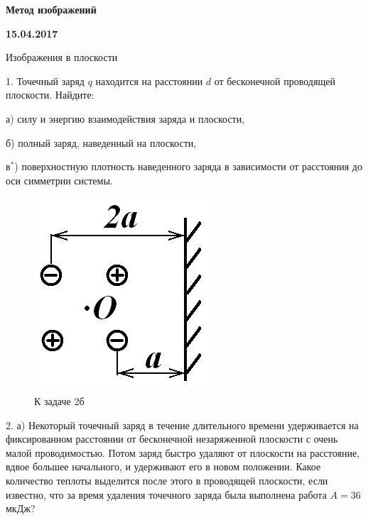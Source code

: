 \documentclass[14pt]{article}
\begin{document}
\begin{center}
\Large{\textbf{Метод изображений}}

\textbf{15.04.2017}
\end{center}
\vspace{5mm}

{\large{Изображения в плоскости}}
\vspace{3mm}

1. Точечный заряд $q$ находится на расстоянии $d$ от бесконечной проводящей плоскости. Найдите:

а) силу и энергию взаимодействия заряда и плоскости,

б) полный заряд, наведенный на плоскости,

в$^*$) поверхностную плотность наведенного заряда в зависимости от расстояния до оси симметрии системы.

\begin{figure}
\begin{center}
\vspace{-4mm}
\includegraphics[scale=0.6]{images1.png}
\vspace{-1.5mm}
\caption{\hspace{-2.5mm}К задаче 2б}
\end{center}
\end{figure}

2. а) Некоторый точечный заряд в течение длительного времени удерживается на фиксированном расстоянии от бесконечной незаряженной плоскости с очень малой проводимостью. Потом заряд быстро удаляют от плоскости на расстояние, вдвое большее начального, и удерживают его в новом положении. Какое количество теплоты выделится после этого в проводящей плоскости, если известно, что за время удаления точечного заряда была выполнена работа $A=36$ мкДж?
\end{document}
